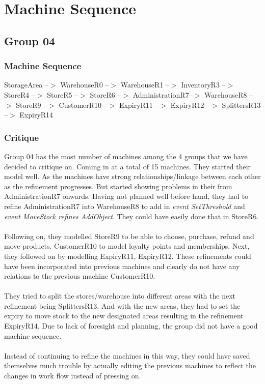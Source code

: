 \section{Machine Sequence}
\label{machinesequence}

\subsection{Group 04}
\label{group04}

\subsubsection{Machine Sequence}
\label{machinesequence}

StorageArea --$>$ WarehouseR0 --$>$ WarehouseR1 --$>$ InventoryR3 --$>$ StoreR4 --$>$ StoreR5 --$>$ StoreR6 --$>$ AdministrationR7--$>$ WarehouseR8 --$>$ StoreR9 --$>$ CustomerR10 --$>$ ExpiryR11 --$>$ ExpiryR12 --$>$ SplittersR13 --$>$ ExpiryR14

\subsubsection{Critique}
\label{critique}

Group 04 has the most number of machines among the 4 groups that we have decided to critique on. Coming in at a total of 15 machines. They started their model well. As the machines have strong relationships\slash linkage between each other as the refinement progresses. But started showing problems in their from AdministrationR7 onwards. Having not planned well before hand, they had to refine AdministrationR7 into WarehouseR8 to add in \emph{event SetThreshold} and \emph{event MoveStock refines AddObject}. They could have easily done that in StoreR6.  \\ \\  Following on, they modelled StoreR9 to be able to choose, purchase, refund and move products. CustomerR10 to model loyalty points and memberships. Next, they followed on by modelling ExpiryR11, ExpiryR12. These refinements could have been incorporated into previous machines and clearly do not have any relations to the previous machine CustomerR10.  \\ \\  They tried to split the stores\slash warehouse into different areas with the next refinement being SplittersR13. And with the new areas, they had to set the expiry to move stock to the new designated areas resulting in the refinement ExpiryR14. Due to lack of foresight and planning, the group did not have a good machine sequence.  \\ \\  Instead of continuing to refine the machines in this way, they could have saved themselves much trouble by actually editing the previous machines to reflect the changes in work flow instead of pressing on.


